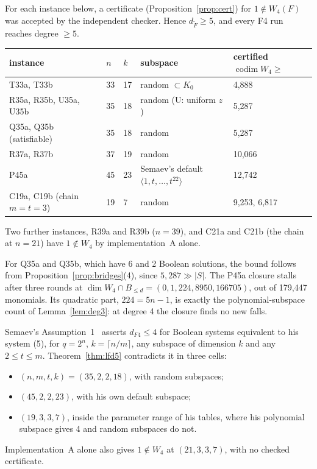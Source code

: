 \begin{theorem}\label{thm:lfd5}
For each instance below, a certificate (Proposition~\ref{prop:cert}) for
$1\notin W_4(F)$ was accepted by the independent checker. Hence
$d_{\tilde F}\ge5$, and every F4 run reaches degree $\ge5$.

\smallskip\noindent
\begin{tabular}{@{}lllll@{}}
\toprule
instance & $n$ & $k$ & subspace & certified $\operatorname{codim}W_4\ge$ \\
\midrule
T33a, T33b & 33 & 17 & random $\subset K_0$ & 4{,}888 \\
R35a, R35b, U35a, U35b & 35 & 18 & random (U: uniform $z$) & 5{,}287 \\
Q35a, Q35b (satisfiable) & 35 & 18 & random & 5{,}287 \\
R37a, R37b & 37 & 19 & random & 10{,}066 \\
P45a & 45 & 23 & Semaev's default $\langle1,t,\ldots,t^{22}\rangle$ & 12{,}742 \\
C19a, C19b (chain $m=t=3$) & 19 & 7 & random & 9{,}253, 6{,}817 \\
\bottomrule
\end{tabular}

\smallskip\noindent
Two further instances, R39a and R39b ($n=39$), and C21a and C21b (the
chain at $n=21$) have $1\notin W_4$ by implementation~A alone.
\end{theorem}

For Q35a and Q35b, which have 6 and 2 Boolean solutions, the bound follows
from Proposition~\ref{prop:bridges}(4), since $5{,}287\gg|S|$. The P45a
closure stalls after three rounds at
$\dim W_4\cap B_{\le d}=(0,1,224,8950,166705)$, out of 179{,}447
monomials. Its quadratic part, $224=5n-1$, is exactly the
polynomial-subspace count of Lemma~\ref{lem:deg3}: at degree 4 the closure
finds no new falls.

\begin{corollary}\label{cor:assump}
Semaev's Assumption~1~\cite[\S4.5]{semaev2015} asserts $d_{F4}\le4$ for
Boolean systems equivalent to his system (5), for $q=2^n$,
$k=\lceil n/m\rceil$, any subspace of dimension $k$ and any $2\le t\le m$.
Theorem~\ref{thm:lfd5} contradicts it in three cells:
\begin{itemize}
\item $(n,m,t,k)=(35,2,2,18)$, with random subspaces;
\item $(45,2,2,23)$, with his own default subspace;
\item $(19,3,3,7)$, inside the parameter range of his tables, where his
  polynomial subspace gives 4 and random subspaces do not.
\end{itemize}
Implementation~A alone also gives $1\notin W_4$ at $(21,3,3,7)$, with no
checked certificate.
\end{corollary}

